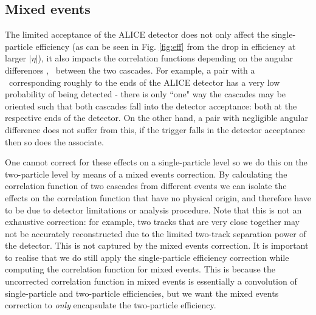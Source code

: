   \subsection{Mixed events}
  \label{sec:ME}

    The limited acceptance of the ALICE detector does not only affect the single-particle efficiency (as can be seen in Fig. \ref{fig:eff} from the drop in efficiency at larger $|\eta|$), it also impacts the correlation functions depending on the angular differences \dphi, \dy\ between the two cascades. For example, a pair with a \dy\ corresponding roughly to the ends of the ALICE detector has a very low probability of being detected - there is only ``one" way the cascades may be oriented such that both cascades fall into the detector acceptance: both at the respective ends of the detector. On the other hand, a pair with negligible angular difference does not suffer from this, if the trigger falls in the detector acceptance then so does the associate. 
    
    One cannot correct for these effects on a single-particle level so we do this on the two-particle level by means of a mixed events correction. 
    By calculating the correlation function of two cascades from different events we can isolate the effects on the correlation function that have no physical origin, and therefore have to be due to detector limitations or analysis procedure. Note that this is not an exhaustive correction: for example, two tracks that are very close together may not be accurately reconstructed due to the limited two-track separation power of the detector. This is not captured by the mixed events correction. 
    It is important to realise that we do still apply the single-particle efficiency correction while computing the correlation function for mixed events. This is because the uncorrected correlation function in mixed events is essentially a convolution of single-particle and two-particle efficiencies, but we want the mixed events correction to \textit{only} encapsulate the two-particle efficiency. 

